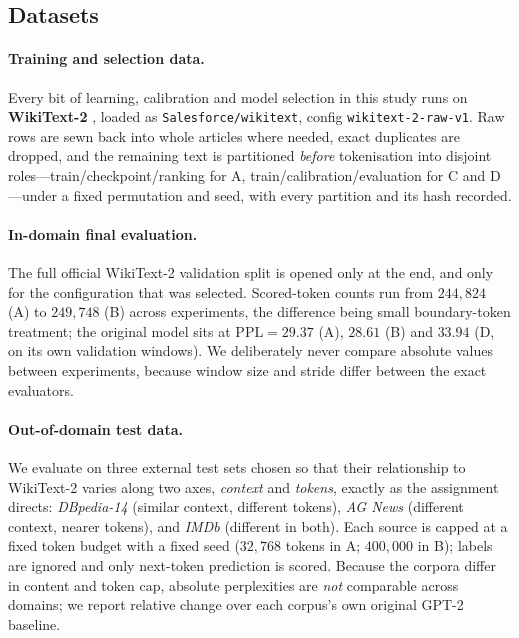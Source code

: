 \documentclass[10pt,a4paper]{article}
\begin{document}
\subsection{Datasets}
\label{sec:datasets}

\paragraph{Training and selection data.} Every bit of learning, calibration and
model selection in this study runs on \textbf{WikiText-2}
\citep{merity2016pointer}, loaded as \texttt{Salesforce/wikitext}, config
\texttt{wikitext-2-raw-v1}. Raw rows are sewn back into whole articles where
needed, exact duplicates are dropped, and the remaining text is partitioned
\emph{before} tokenisation into disjoint roles---train/checkpoint/ranking for
A, train/calibration/evaluation for C and D---under a fixed permutation and
seed, with every partition and its hash recorded.

\paragraph{In-domain final evaluation.} The full official WikiText-2
validation split is opened only at the end, and only for the configuration that
was selected. Scored-token counts run from $244{,}824$ (A) to $249{,}748$ (B)
across experiments, the difference being small boundary-token treatment; the
original model sits at $\mathrm{PPL}=29.37$ (A), $28.61$ (B) and $33.94$ (D,
on its own validation windows). We deliberately never compare absolute values
between experiments, because window size and stride differ between the exact
evaluators.

\paragraph{Out-of-domain test data.} We evaluate on three external test sets
chosen so that their relationship to WikiText-2 varies along two axes,
\emph{context} and \emph{tokens}, exactly as the assignment directs:
\emph{DBpedia-14} \citep{zhang2015character,lehmann2015dbpedia} (similar
context, different tokens), \emph{AG News} \citep{zhang2015character} (different
context, nearer tokens), and \emph{IMDb} \citep{maas2011learning} (different in
both). Each source is capped at a fixed token budget with a fixed seed
($32{,}768$ tokens in A; $400{,}000$ in B); labels are ignored and only
next-token prediction is scored. Because the corpora differ in content and token
cap, absolute perplexities are \emph{not} comparable across domains; we report
relative change over each corpus's own original GPT-2 baseline.
\end{document}
